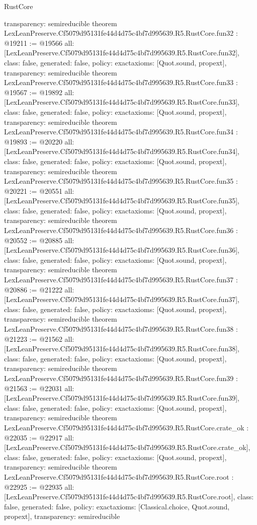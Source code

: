 \begin{lexlean}{RustCore}
\begin{coremodule}
{  transparency: semireducible
}
theorem LexLeanPreserve.Cf5079d95131fe44d4d75c4bf7d995639.R5.RustCore.fun32 : @19211 := @19566 {
  all: [LexLeanPreserve.Cf5079d95131fe44d4d75c4bf7d995639.R5.RustCore.fun32],
  class: false,
  generated: false,
  policy: exact{axioms: [Quot.sound, propext]},
  transparency: semireducible
}
theorem LexLeanPreserve.Cf5079d95131fe44d4d75c4bf7d995639.R5.RustCore.fun33 : @19567 := @19892 {
  all: [LexLeanPreserve.Cf5079d95131fe44d4d75c4bf7d995639.R5.RustCore.fun33],
  class: false,
  generated: false,
  policy: exact{axioms: [Quot.sound, propext]},
  transparency: semireducible
}
theorem LexLeanPreserve.Cf5079d95131fe44d4d75c4bf7d995639.R5.RustCore.fun34 : @19893 := @20220 {
  all: [LexLeanPreserve.Cf5079d95131fe44d4d75c4bf7d995639.R5.RustCore.fun34],
  class: false,
  generated: false,
  policy: exact{axioms: [Quot.sound, propext]},
  transparency: semireducible
}
theorem LexLeanPreserve.Cf5079d95131fe44d4d75c4bf7d995639.R5.RustCore.fun35 : @20221 := @20551 {
  all: [LexLeanPreserve.Cf5079d95131fe44d4d75c4bf7d995639.R5.RustCore.fun35],
  class: false,
  generated: false,
  policy: exact{axioms: [Quot.sound, propext]},
  transparency: semireducible
}
theorem LexLeanPreserve.Cf5079d95131fe44d4d75c4bf7d995639.R5.RustCore.fun36 : @20552 := @20885 {
  all: [LexLeanPreserve.Cf5079d95131fe44d4d75c4bf7d995639.R5.RustCore.fun36],
  class: false,
  generated: false,
  policy: exact{axioms: [Quot.sound, propext]},
  transparency: semireducible
}
theorem LexLeanPreserve.Cf5079d95131fe44d4d75c4bf7d995639.R5.RustCore.fun37 : @20886 := @21222 {
  all: [LexLeanPreserve.Cf5079d95131fe44d4d75c4bf7d995639.R5.RustCore.fun37],
  class: false,
  generated: false,
  policy: exact{axioms: [Quot.sound, propext]},
  transparency: semireducible
}
theorem LexLeanPreserve.Cf5079d95131fe44d4d75c4bf7d995639.R5.RustCore.fun38 : @21223 := @21562 {
  all: [LexLeanPreserve.Cf5079d95131fe44d4d75c4bf7d995639.R5.RustCore.fun38],
  class: false,
  generated: false,
  policy: exact{axioms: [Quot.sound, propext]},
  transparency: semireducible
}
theorem LexLeanPreserve.Cf5079d95131fe44d4d75c4bf7d995639.R5.RustCore.fun39 : @21563 := @22031 {
  all: [LexLeanPreserve.Cf5079d95131fe44d4d75c4bf7d995639.R5.RustCore.fun39],
  class: false,
  generated: false,
  policy: exact{axioms: [Quot.sound, propext]},
  transparency: semireducible
}
theorem LexLeanPreserve.Cf5079d95131fe44d4d75c4bf7d995639.R5.RustCore.crate_ok : @22035 := @22917 {
  all: [LexLeanPreserve.Cf5079d95131fe44d4d75c4bf7d995639.R5.RustCore.crate_ok],
  class: false,
  generated: false,
  policy: exact{axioms: [Quot.sound, propext]},
  transparency: semireducible
}
theorem LexLeanPreserve.Cf5079d95131fe44d4d75c4bf7d995639.R5.RustCore.root : @22925 := @22935 {
  all: [LexLeanPreserve.Cf5079d95131fe44d4d75c4bf7d995639.R5.RustCore.root],
  class: false,
  generated: false,
  policy: exact{axioms: [Classical.choice, Quot.sound, propext]},
  transparency: semireducible
}


\end{coremodule}
\end{lexlean}

